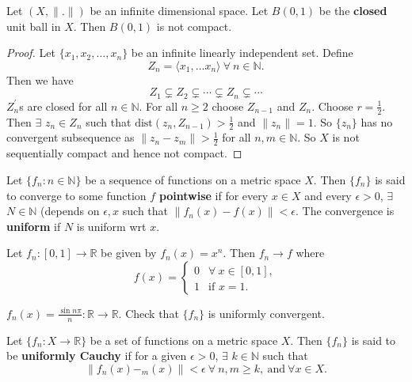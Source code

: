 \documentclass{functionspaces}
\begin{document}
\begin{theorem}
Let $(X,\|.\|)$ be an infinite dimensional space. Let $B(0,1)$ be the \textbf{closed} unit ball in $X$. Then $B(0,1)$ is not compact.
\end{theorem}

\begin{proof}
Let $\{x_{1},x_{2},\ldots,x_{n}\}$ be an infinite linearly independent set. Define
\[
Z_{n}=\langle x_{1},\ldots x_{n}\rangle\ \forall\ n \in \mathbb{N}.
\]
Then we have
\[
Z_{1}\subsetneq Z_{2}\subsetneq \cdots \subsetneq Z_{n}\subsetneq \cdots
\]
$Z^{\prime}_{n}$s are closed for all $n \in \mathbb{N}$. For all $n \geq 2$ choose $Z_{n-1}$ and $Z_{n}$. Choose $r=\frac{1}{2}$. Then $\exists$ $z_{n} \in Z_{n}$ such that $\text{dist}(z_{n},Z_{n-1})>\frac{1}{2}$ and $\|z_{n}\|=1$. So $\{z_{n}\}$ has no convergent subsequence as $\|z_{n}-z_{m}\|>\frac{1}{2}$ for all $n,m \in \mathbb{N}$. So $X$ is not sequentially compact and hence not compact.
\end{proof}

\begin{definition}
Let $\{f_{n}:n \in \mathbb{N}\}$ be a sequence of functions on a metric space $X$. Then $\{f_{n}\}$ is said to converge to some function $f$ \textbf{pointwise} if for every $x \in X$ and every $\epsilon>0$, $\exists$ $N \in \mathbb{N}$ (depends on $\epsilon,x$ such that $\|f_{n}(x)-f(x)\|<\epsilon$. The convergence is \textbf{uniform} if $N$ is uniform wrt $x$.
\end{definition}

\begin{example}
Let $f_{n}:[0,1]\rightarrow \mathbb{R}$ be given by $f_{n}(x)=x^{n}$. Then $f_{n}\to f$ where
\[
f(x)=\begin{cases} 
0 & \forall\ x \in [0,1], \\ 
1 & \text{if }x=1.
\end{cases}
\]
\end{example}

\begin{example}
$f_{n}(x)=\frac{\sin n\pi}{n}:\mathbb{R}\rightarrow \mathbb{R}$. Check that $\{f_{n}\}$ is uniformly convergent.
\end{example}

\begin{definition}
Let $\{f_{n}:X\rightarrow \mathbb{R}\}$ be a set of functions on a metric space $X$. Then $\{f_{n}\}$ is said to be \textbf{uniformly Cauchy} if for a given $\epsilon>0$, $\exists$ $k \in \mathbb{N}$ such that
\[
\|f_{n}(x)-_{m}(x)\|<\epsilon\ \forall\ n,m \geq k,\ \text{and}\ \forall x \in X.
\]
\end{definition}
\end{document}

